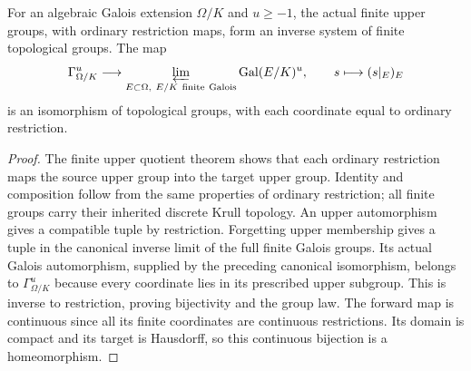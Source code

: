 \begin{lemma}
\label{fw:upper-inverse-limit}
\leanok
For an algebraic Galois extension $\Omega/K$ and $u\geq-1$, the actual
finite upper groups, with ordinary restriction maps, form an inverse
system of finite topological groups. The map
\[
 \Gamma_{\Omega/K}^u\longrightarrow
 \varprojlim_{E\subset\Omega,\ E/K\ \mathrm{finite\ Galois}}\operatorname{Gal}(E/K)^u,
 \qquad s\longmapsto(s|_E)_E
\]
is an isomorphism of topological groups, with each coordinate equal to
ordinary restriction.
\end{lemma}
\begin{proof}
The finite upper quotient theorem shows that each ordinary restriction
maps the source upper group into the target upper group. Identity and
composition follow from the same properties of ordinary restriction;
all finite groups carry their inherited discrete Krull topology.
An upper automorphism gives a compatible tuple by restriction. Forgetting
upper membership gives a tuple in the canonical inverse limit of the
full finite Galois groups. Its actual Galois automorphism, supplied by
the preceding canonical isomorphism, belongs to
$\Gamma_{\Omega/K}^u$ because every coordinate lies in its prescribed
upper subgroup. This is inverse to restriction, proving bijectivity
and the group law. The forward map is continuous since all its finite
coordinates are continuous restrictions. Its domain is compact and its
target is Hausdorff, so this continuous bijection is a homeomorphism.
\end{proof}

